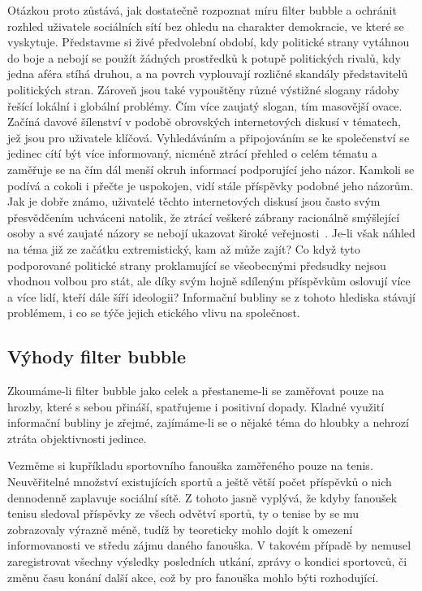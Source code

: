 \documentclass[12pt, a4paper]{article}
\numberwithin{equation}{section} 	%
\begin{document}
Otázkou proto zůstává, jak dostatečně rozpoznat míru filter bubble a ochránit rozhled uživatele sociálních sítí bez ohledu na charakter demokracie, ve které se vyskytuje. Představme si živé předvolební období, kdy politické strany vytáhnou do boje a nebojí se použít žádných prostředků k potupě politických rivalů, kdy jedna aféra stíhá druhou, a na povrch vyplouvají rozličné skandály představitelů politických stran. Zároveň jsou také vypouštěny různé výstižné slogany rádoby řešící lokální i globální problémy. Čím více zaujatý slogan, tím masovější ovace. Začíná davové šílenství v podobě obrovských internetových diskusí v tématech, jež jsou pro uživatele klíčová. Vyhledáváním a připojováním se ke společenství se jedinec cítí být více informovaný, nicméně ztrácí přehled o celém tématu a zaměřuje se na čím dál menší okruh informací podporující jeho názor. Kamkoli se podívá a cokoli i přečte je uspokojen, vidí stále příspěvky podobné jeho názorům. Jak je dobře známo, uživatelé těchto internetových diskusí jsou často svým přesvědčením uchváceni natolik, že ztrácí veškeré zábrany racionálně smýšlející osoby a své zaujaté názory se nebojí ukazovat široké veřejnosti~\cite{DemocracyOnline}. Je-li však náhled na téma již ze začátku extremistický, kam až může zajít? Co když tyto podporované politické strany proklamující se všeobecnými předsudky nejsou vhodnou volbou pro stát, ale díky svým hojně sdíleným příspěvkům oslovují více a více lidí, kteří dále šíří ideologii? Informační bubliny se z tohoto hlediska stávají problémem, i co se týče jejich etického vlivu na společnost.


\subsection{Výhody filter bubble}
\noindent Zkoumáme-li filter bubble jako celek a přestaneme-li se zaměřovat pouze na hrozby, které s sebou přináší, spatřujeme i positivní dopady. Kladné využití informační bubliny je zřejmé, zajímáme-li se o nějaké téma do hloubky a nehrozí ztráta objektivnosti jedince.

Vezměme si kupříkladu sportovního fanouška zaměřeného pouze na tenis. Neuvěřitelné množství existujících sportů a ještě větší počet příspěvků o nich dennodenně zaplavuje sociální sítě. Z tohoto jasně vyplývá, že kdyby fanoušek tenisu sledoval příspěvky ze všech odvětví sportů, ty o tenise by se mu zobrazovaly výrazně méně, tudíž by teoreticky mohlo dojít k omezení informovanosti ve středu zájmu daného fanouška. V takovém případě by nemusel zaregistrovat všechny výsledky posledních utkání, zprávy o kondici sportovců, či změnu času konání další akce, což by pro fanouška mohlo býti rozhodující.
\end{document}

